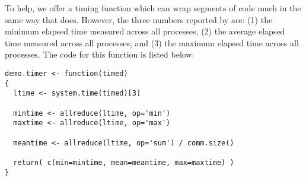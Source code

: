 To help, we offer a timing function  which can wrap segments of code much in the same way that  does.  However, the three numbers reported by  are: (1) the minimum elapsed time measured across all processes, (2) the average elapsed time measured across all processes, and (3) the maximum elapsed time across all processes.  The code for this function is listed below:

\begin{lstlisting}[language=rr,title=Timer Function]
demo.timer <- function(timed)
{
  ltime <- system.time(timed)[3]
  
  mintime <- allreduce(ltime, op='min')
  maxtime <- allreduce(ltime, op='max')
  
  meantime <- allreduce(ltime, op='sum') / comm.size()
  
  return( c(min=mintime, mean=meantime, max=maxtime) )
}
\end{lstlisting}